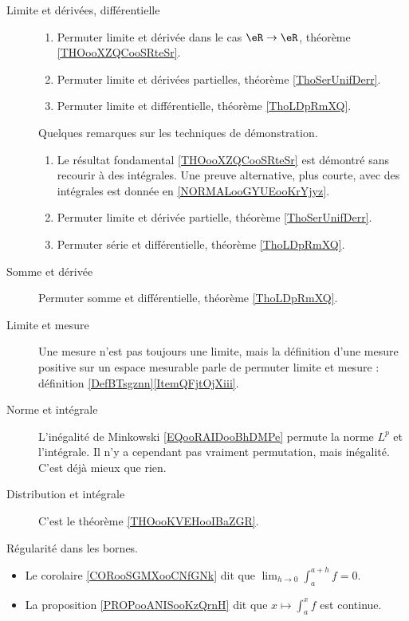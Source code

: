 \begin{description}
	\item[Limite et dérivées, différentielle]
		\begin{enumerate}
			\item
			      Permuter limite et dérivée dans le cas \( \eR\to \eR\), théorème \ref{THOooXZQCooSRteSr}.
			\item
			      Permuter limite et dérivées partielles, théorème \ref{ThoSerUnifDerr}.
			\item
			      Permuter limite et différentielle, théorème \ref{ThoLDpRmXQ}.
		\end{enumerate}
		Quelques remarques sur les techniques de démonstration.
		\begin{enumerate}
			\item
			      Le résultat fondamental \ref{THOooXZQCooSRteSr} est démontré sans recourir à des intégrales. Une preuve alternative, plus courte, avec des intégrales est donnée en \ref{NORMALooGYUEooKrYjyz}.
			\item
			      Permuter limite et dérivée partielle, théorème \ref{ThoSerUnifDerr}.
			\item
			      Permuter série et différentielle, théorème \ref{ThoLDpRmXQ}.
		\end{enumerate}
	\item[Somme et dérivée]
		Permuter somme et différentielle, théorème \ref{ThoLDpRmXQ}.
	\item[Limite et mesure]
		Une mesure n'est pas toujours une limite, mais la définition d'une mesure positive sur un espace mesurable parle de permuter limite et mesure : définition \ref{DefBTsgznn}\ref{ItemQFjtOjXiii}.
	\item[Norme et intégrale]
		L'inégalité de Minkowski \eqref{EQooRAIDooBhDMPe} permute la norme \( L^p\) et l'intégrale. Il n'y a cependant pas vraiment permutation, mais inégalité. C'est déjà mieux que rien.
	\item[Distribution et intégrale] C'est le théorème \ref{THOooKVEHooIBaZGR}.
\end{description}

Régularité dans les bornes.
\begin{itemize}
	\item
	      Le corolaire \ref{CORooSGMXooCNfGNk} dit que \( \lim_{h\to 0}\int_a^{a+h}f=0\).
	\item
	      La proposition \ref{PROPooANISooKzQrnH} dit que \( x\mapsto \int_a^xf\) est continue.
\end{itemize}
